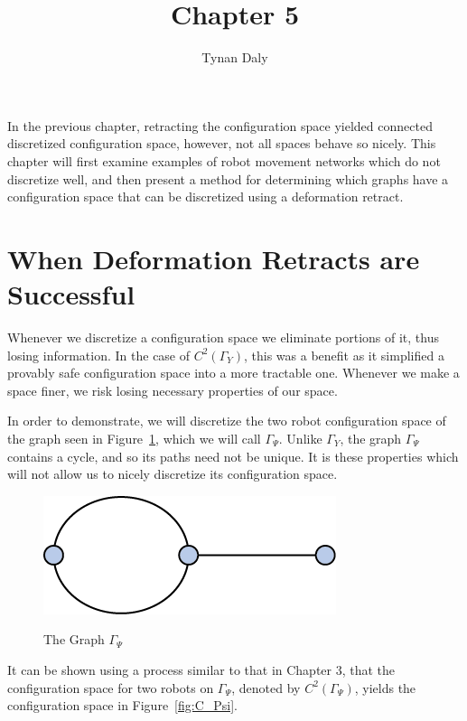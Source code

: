 \documentclass[12pt,oneside]{amsbook}
\title{Chapter 5}
\author{Tynan Daly}
\newcommand{\Y}{\Gamma_Y}
\newcommand{\C}{$C^2(\Y)$}
\begin{document}
In the previous chapter, retracting the configuration space yielded connected discretized configuration space, however, not all spaces behave so nicely. This chapter will first examine examples of robot movement networks which do not discretize well, and then present a method for determining which graphs have a configuration space that can be discretized using a deformation retract.

\section{When Deformation Retracts are Successful}
Whenever we discretize a configuration space we eliminate portions of it, thus losing information. In the case of \C, this was a benefit as it simplified a provably safe configuration space into a more tractable one. Whenever we make a space finer, we risk losing necessary properties of our space. 

In order to demonstrate, we will discretize the two robot configuration space of the graph seen in Figure~\ref{fig:bad}, which we will call $\Gamma_{\Psi}$. Unlike $\Y$, the graph $\Gamma_{\Psi}$ contains a cycle, and so its paths need not be unique. It is these properties which will not allow us to nicely discretize its configuration space. 

\begin{figure}[h]
\centering
\caption{The Graph $\Gamma_{\Psi}$}
\includegraphics[scale=1]{Bad.png}
\label{fig:bad}
\end{figure}

It can be shown using a process similar to that in Chapter 3, that the configuration space for two robots on $\Gamma_{\Psi}$, denoted by $C^2(\Gamma_{\Psi})$, yields the configuration space in Figure~\ref{fig:C_Psi}.
\end{document}
